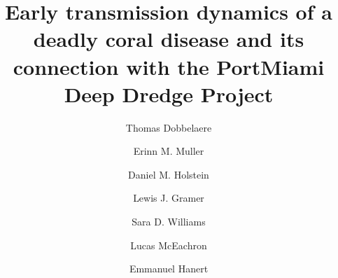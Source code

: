 \documentclass[preprint,12pt,authoryear]{elsarticle}
\begin{document}
\begin{frontmatter}



    \title{Early transmission dynamics of a deadly coral disease and its connection with the PortMiami Deep Dredge Project}%
%
%
%

    \author[eli]{Thomas Dobbelaere}
    \author[mote]{Erinn M. Muller}
    \author[lsu]{Daniel M. Holstein}
    \author[cimas,aoml]{Lewis J. Gramer}
    \author[mote]{Sara D. Williams}
    \author[fwc]{Lucas McEachron}
    \author[eli,immc]{Emmanuel Hanert}


\end{frontmatter}
\end{document}
